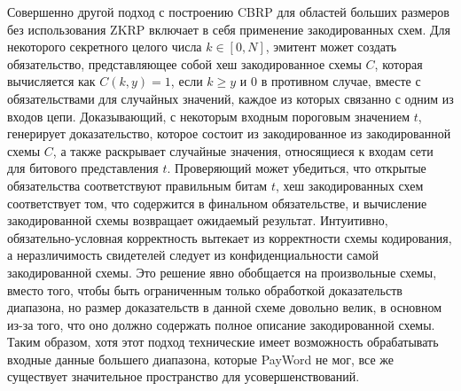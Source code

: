 Совершенно другой подход с построению CBRP для областей больших размеров без использования ZKRP включает в себя применение закодированных схем.
Для некоторого секретного целого числа $k \in [0, N]$, эмитент может создать обязательство, представляющее собой хеш закодированное схемы $C$, которая вычисляется как $C(k, y) = 1$, если $k \geq y$ и $0$ в противном случае, вместе с обязательствами для случайных значений, каждое из которых связанно с одним из входов цепи.
Доказывающий, с некоторым входным пороговым значением $t$, генерирует доказательство, которое состоит из закодированное из закодированной схемы $C$, а также раскрывает случайные значения, относящиеся к входам сети для битового представления $t$.
Проверяющий может убедиться, что открытые обязательства соответствуют правильным битам $t$, хеш закодированных схем соответствует том, что содержится в финальном обязательстве, и вычисление закодированной схемы возвращает ожидаемый результат.
Интуитивно, обязательно-условная корректность вытекает из корректности схемы кодирования, а неразличимость свидетелей следует из конфиденциальности самой закодированной схемы.
Это решение явно обобщается на произвольные схемы, вместо того, чтобы быть ограниченным только обработкой доказательств диапазона, но размер доказательств в данной схеме довольно велик, в основном из-за того, что оно должно содержать полное описание закодированной схемы.
Таким образом, хотя этот подход технические имеет возможность обрабатывать входные данные большего диапазона, которые PayWord не мог, все же существует значительное пространство для усовершенствований.

